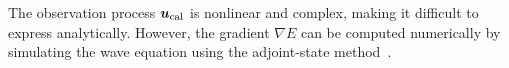 The observation process $\bm{u}_{\mathrm{cal}}$ is nonlinear and complex, making it difficult to express analytically.
However, the gradient $\nabla E$ can be computed numerically by simulating the wave equation using the adjoint-state method~\cite{FWI-gradient}.


